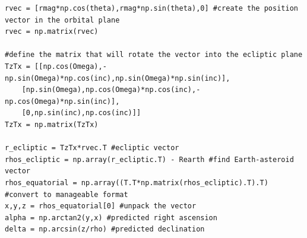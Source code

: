 \documentclass[a4paper,12pt]{article}
\begin{document}
\begin{appendices}
\begin{verbatim}
rvec = [rmag*np.cos(theta),rmag*np.sin(theta),0] #create the position vector in the orbital plane
rvec = np.matrix(rvec)

#define the matrix that will rotate the vector into the ecliptic plane
TzTx = [[np.cos(Omega),-np.sin(Omega)*np.cos(inc),np.sin(Omega)*np.sin(inc)],
    [np.sin(Omega),np.cos(Omega)*np.cos(inc),-np.cos(Omega)*np.sin(inc)],
    [0,np.sin(inc),np.cos(inc)]]
TzTx = np.matrix(TzTx)

r_ecliptic = TzTx*rvec.T #ecliptic vector
rhos_ecliptic = np.array(r_ecliptic.T) - Rearth #find Earth-asteroid vector
rhos_equatorial = np.array((T.T*np.matrix(rhos_ecliptic).T).T) #convert to manageable format
x,y,z = rhos_equatorial[0] #unpack the vector
alpha = np.arctan2(y,x) #predicted right ascension
delta = np.arcsin(z/rho) #predicted declination

\end{verbatim}
\normalsize

\end{appendices}
\end{document}
